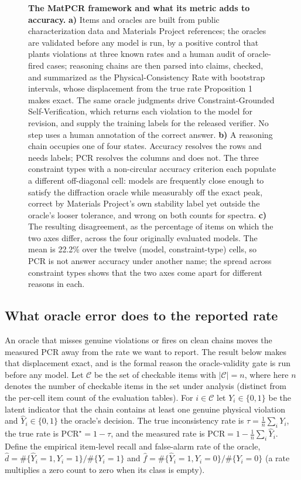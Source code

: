 \documentclass[pdflatex,sn-nature]{sn-jnl}
\begin{document}
\begin{figure}[p]
\caption{\justifying\textbf{The MatPCR framework and what its metric adds to accuracy.} \textbf{a)} Items and oracles are built from public characterization data and Materials Project references; the oracles are validated before any model is run, by a positive control that plants violations at three known rates and a human audit of oracle-fired cases; reasoning chains are then parsed into claims, checked, and summarized as the Physical-Consistency Rate with bootstrap intervals, whose displacement from the true rate Proposition 1 makes exact. The same oracle judgments drive Constraint-Grounded Self-Verification, which returns each violation to the model for revision, and supply the training labels for the released verifier. No step uses a human annotation of the correct answer. \textbf{b)} A reasoning chain occupies one of four states. Accuracy resolves the rows and needs labels; PCR resolves the columns and does not. The three constraint types with a non-circular accuracy criterion each populate a different off-diagonal cell: models are frequently close enough to satisfy the diffraction oracle while measurably off the exact peak, correct by Materials Project's own stability label yet outside the oracle's looser tolerance, and wrong on both counts for spectra. \textbf{c)} The resulting disagreement, as the percentage of items on which the two axes differ, across the four originally evaluated models. The mean is 22.2\% over the twelve (model, constraint-type) cells, so PCR is not answer accuracy under another name; the spread across constraint types shows that the two axes come apart for different reasons in each.}
\label{fig:pipeline}
\end{figure}

\subsection*{What oracle error does to the reported rate}
An oracle that misses genuine violations or fires on clean chains moves the measured PCR away
from the rate we want to report. The result below makes that displacement exact, and is the
formal reason the oracle-validity gate is run before any model. Let
$\mathcal{C}$ be the set of checkable items with $|\mathcal{C}|=n$, where here $n$ denotes
the number of checkable items in the set under analysis (distinct from the per-cell item
count of the evaluation tables). For
$i\in\mathcal{C}$ let $Y_i\in\{0,1\}$ be the latent indicator that the chain contains
at least one genuine physical violation and $\hat Y_i\in\{0,1\}$ the oracle's decision.
The true inconsistency rate is $\tau=\frac1n\sum_i Y_i$, the true rate is
$\mathrm{PCR}^\star=1-\tau$, and the measured rate is
$\mathrm{PCR}=1-\frac1n\sum_i\hat Y_i$. Define the empirical item-level recall and
false-alarm rate of the oracle,
$\hat d=\#\{\hat Y_i{=}1,Y_i{=}1\}/\#\{Y_i{=}1\}$ and
$\hat f=\#\{\hat Y_i{=}1,Y_i{=}0\}/\#\{Y_i{=}0\}$ (a rate multiplies a zero
count to zero when its class is empty).
\end{document}
